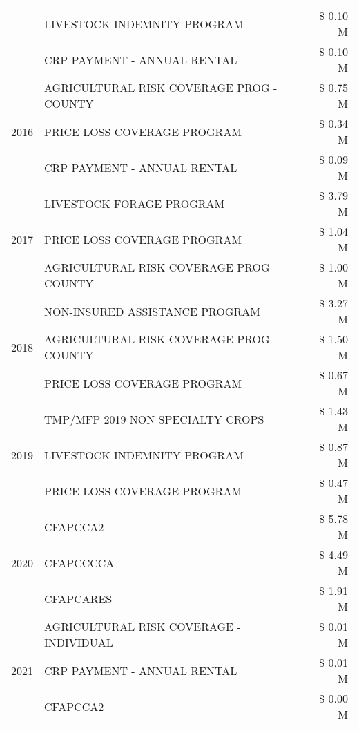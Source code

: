 \begin{tabular}{llr}
 & LIVESTOCK INDEMNITY PROGRAM & \$ 0.10 M \\
 & CRP PAYMENT - ANNUAL RENTAL & \$ 0.10 M \\
\cline{1-3}
\multirow[t]{3}{*}{2016} & AGRICULTURAL RISK COVERAGE PROG - COUNTY & \$ 0.75 M \\
 & PRICE LOSS COVERAGE PROGRAM & \$ 0.34 M \\
 & CRP PAYMENT - ANNUAL RENTAL & \$ 0.09 M \\
\cline{1-3}
\multirow[t]{3}{*}{2017} & LIVESTOCK FORAGE PROGRAM & \$ 3.79 M \\
 & PRICE LOSS COVERAGE PROGRAM & \$ 1.04 M \\
 & AGRICULTURAL RISK COVERAGE PROG - COUNTY & \$ 1.00 M \\
\cline{1-3}
\multirow[t]{3}{*}{2018} & NON-INSURED ASSISTANCE PROGRAM & \$ 3.27 M \\
 & AGRICULTURAL RISK COVERAGE PROG - COUNTY & \$ 1.50 M \\
 & PRICE LOSS COVERAGE PROGRAM & \$ 0.67 M \\
\cline{1-3}
\multirow[t]{3}{*}{2019} & TMP/MFP 2019 NON SPECIALTY CROPS & \$ 1.43 M \\
 & LIVESTOCK INDEMNITY PROGRAM & \$ 0.87 M \\
 & PRICE LOSS COVERAGE PROGRAM & \$ 0.47 M \\
\cline{1-3}
\multirow[t]{3}{*}{2020} & CFAPCCA2 & \$ 5.78 M \\
 & CFAPCCCCA & \$ 4.49 M \\
 & CFAPCARES & \$ 1.91 M \\
\cline{1-3}
\multirow[t]{3}{*}{2021} & AGRICULTURAL RISK COVERAGE - INDIVIDUAL & \$ 0.01 M \\
 & CRP PAYMENT - ANNUAL RENTAL & \$ 0.01 M \\
 & CFAPCCA2 & \$ 0.00 M \\
\cline{1-3}
\bottomrule
\end{tabular}

